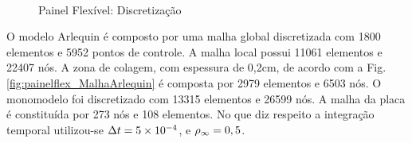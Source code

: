\documentclass[tese_patricia]{subfiles}
\begin{document}
\begin{figure}[htb!]
	\centering
	\\ 
	\caption{Painel Flexível: Discretização}
\end{figure}

O modelo Arlequin é composto por uma malha global discretizada com 1800 elementos e 5952 pontos de controle. A malha local possui 11061 elementos e 22407 nós. A zona de colagem, com espessura de 0,2cm, de acordo com a Fig. \ref{fig:painelflex_MalhaArlequin} é composta por 2979 elementos e 6503 nós.  O monomodelo foi discretizado com 13315 elementos e 26599 nós. A malha da placa é constituída por 273 nós e 108 elementos. No que diz respeito a integração temporal utilizou-se $\Delta t = 5\times10^{-4}$, e $\rho_\infty = 0,5$.
\end{document}
